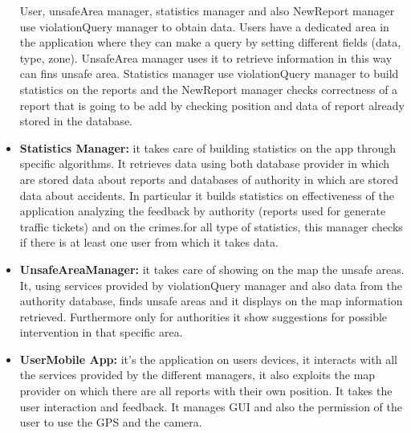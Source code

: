 \documentclass[../RASD.tex]{subfiles}
\begin{document}
\begin{itemize}
        User, unsafeArea manager, statistics manager and also NewReport manager use violationQuery manager to obtain data.
        Users have a dedicated area in the application where they can make a query by setting different fields (data, type, zone).
        UnsafeArea manager uses it to retrieve information in this way can fins unsafe area.
        Statistics manager use violationQuery manager to build statistics on the reports and the NewReport manager checks correctness of a report
        that is going to be add by checking position and data of report already stored in the database.
        \item \textbf{Statistics Manager:} it takes care of building statistics on the app through specific algorithms.
        It retrieves data using both database provider in which are stored data about reports and databases of authority in which are stored data about accidents.
        In particular it builds statistics on effectiveness of the application analyzing the feedback by authority (reports used for generate traffic tickets)
        and on the crimes.for all type of statistics, this manager checks if there is at least one user from which it takes data.
        \item \textbf{UnsafeAreaManager:} it takes care of showing on the map the unsafe areas.
        It, using services provided by violationQuery manager and also data from the authority database,
        finds unsafe areas and it displays on the map information retrieved.
        Furthermore only for authorities it show suggestions for possible intervention in that specific area.
        \item \textbf{UserMobile App:} it’s the application on users devices, it interacts with all the services provided by the different managers,
        it also exploits the map provider on which there are all reports with their own position.
        It takes the user interaction and feedback.
        It manages GUI and also the permission of the user to use the GPS and the camera.
    \end{itemize}
\end{document}
